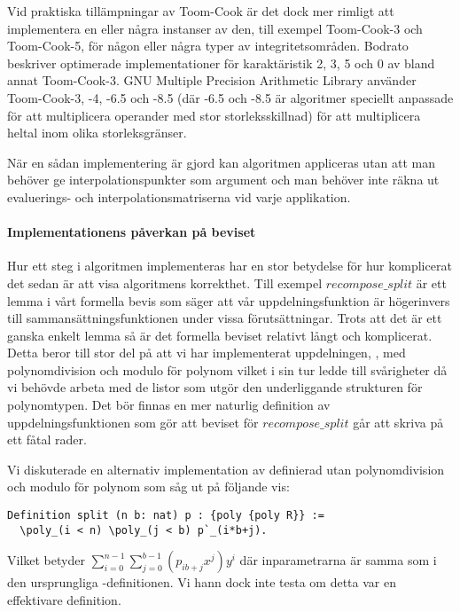 Vid praktiska tillämpningar av Toom-Cook är det dock mer rimligt att implementera
en eller några instanser av den, till exempel Toom-Cook-3 och Toom-Cook-5, för
någon eller några typer av
integritetsområden.
Bodrato\cite{bodrato2007notes}\cite{bodrato2007towards}\cite{bodrato2007integer}
beskriver optimerade implementationer för karaktäristik 2, 3, 5 och 0 av bland
annat Toom-Cook-3. GNU Multiple Precision Arithmetic Library använder
Toom-Cook-3, -4, -6.5 och -8.5 (där -6.5 och -8.5 är algoritmer speciellt anpassade
för att multiplicera operander med stor storleksskillnad) för att multiplicera
heltal inom olika storleksgränser\cite{gmpdoc}.

När en sådan implementering är gjord kan algoritmen appliceras utan att man
behöver ge interpolationspunkter som argument och man behöver inte räkna ut evaluerings- och
interpolationsmatriserna vid varje applikation.

\paragraph{Implementationens påverkan på beviset} Hur ett steg i algoritmen
implementeras har en stor betydelse för hur komplicerat det sedan är att visa
algoritmens korrekthet. Till exempel $recompose\_split$ är ett lemma i vårt
formella bevis som säger att vår uppdelningsfunktion  är högerinvers
till sammansättningsfunktionen  under vissa förutsättningar. Trots
att det är ett ganska enkelt lemma så är det formella beviset relativt långt
och komplicerat. Detta beror till stor del på att vi har implementerat
uppdelningen, , med polynomdivision och modulo för polynom vilket i
sin tur ledde till svårigheter då vi behövde arbeta med de listor som utgör den
underliggande strukturen för polynomtypen. Det bör finnas en mer naturlig
definition av uppdelningsfunktionen som gör att beviset för $recompose\_split$
går att skriva på ett fåtal rader.

Vi diskuterade en alternativ implementation av  definierad utan
polynomdivision och modulo för polynom som såg ut på följande vis:
\begin{lstlisting}
Definition split (n b: nat) p : {poly {poly R}} :=
  \poly_(i < n) \poly_(j < b) p`_(i*b+j).
\end{lstlisting}
Vilket betyder $\sum_{i=0}^{n-1}\sum_{j=0}^{b-1}(p_{ib+j}x^j)y^i$ där
inparametrarna är samma som i den ursprungliga -definitionen. Vi hann
dock inte testa om detta var en effektivare definition.
